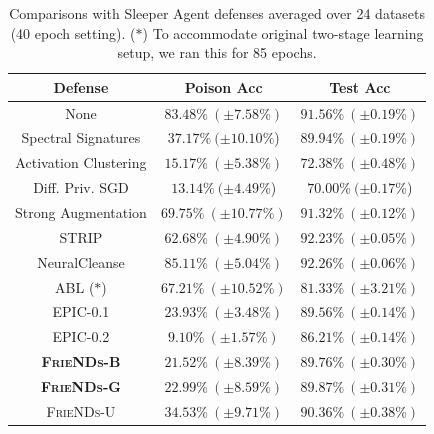 \documentclass{article}
\newcommand{\alg}{\textsc{FrieNDs}}
\begin{document}
\begin{table}[t]
    \centering
    \caption{Comparisons with Sleeper Agent defenses averaged over 24 datasets (40 epoch setting). ($\ast$) To accommodate original two-stage learning setup, we ran this for 85 epochs.}
    \begin{tabular}{c|cc}
    \toprule
         Defense & Poison Acc & Test Acc \\
         \midrule
         None & $83.48\%\ (\pm 7.58\%)$ & $91.56\%\ (\pm 0.19\%)$ \\
         Spectral Signatures \cite{tran2018spectral} & $37.17\%\ (\pm 10.10\%$) & $89.94\%\ (\pm 0.19\%)$ \\
         Activation Clustering \cite{chen2019detecting} & $15.17\%\ (\pm 5.38\%)$ & $72.38\%\ (\pm 0.48\%)$ \\
         Diff. Priv. SGD \cite{hong2020effectiveness} & $13.14\%\ (\pm 4.49\%$) & $70.00\%\ (\pm 0.17\%$) \\
         Strong Augmentation \cite{borgnia2021dp} & $69.75\%\ (\pm 10.77\%)$ & $91.32\%\ (\pm0.12\%)$ \\
         STRIP \cite{gao2019strip} & $62.68\%\ (\pm 4.90\%)$ & $92.23\%\ (\pm 0.05\%)$ \\
         NeuralCleanse \cite{wang2019neural} & $85.11\%\ (\pm 5.04\%)$ & $92.26\%\ (\pm 0.06\%)$ \\
         ABL \cite{li2021anti} ($\ast$) & $67.21\%\ (\pm 10.52\%)$ & $81.33\%\ (\pm 3.21\%)$\\
         EPIC-0.1 \cite{yang2022not} & $23.93\%\ (\pm 3.48\%)$ & $89.56\%\ (\pm 0.14\%)$ \\
         EPIC-0.2 \cite{yang2022not} & $\mathbf{9.10\%\ (\pm 1.57\%)}$ & $86.21\%\ (\pm 0.14\%)$ \\
         \textbf{\alg-B} & $\mathbf{21.52\%\ (\pm 8.39\%)}$ & $\mathbf{89.76\%\ (\pm 0.30\%)}$ \\
         \textbf{\alg-G} & $\mathbf{22.99\%\ (\pm 8.59\%)}$ & $\mathbf{89.87\%\ (\pm 0.31\%)}$ \\
         \alg-U & $34.53\%\ (\pm 9.71\%)$  &  $90.36\%\ (\pm 0.38\%)$  \\
         \bottomrule
    \end{tabular}
    \label{tab:sleeper}
\end{table}
\end{document}

